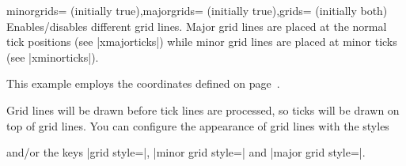 \begin{pgfplotsxykeylist}{\x minorgrids= (initially true),\x majorgrids= (initially true),grids= (initially both)}
Enables/disables different grid lines. Major grid lines are placed at the normal tick positions (see |xmajorticks|) while minor grid lines are placed at minor ticks (see |xminorticks|). 

This example employs the coordinates defined on page~\pageref{page:plotcoords:src}.
\begin{codeexample}[]
\begin{tikzpicture}
\begin{loglogaxis}[
	xlabel={\textsc{Dof}},
	ylabel={$L_2$ Error},
	grid=major
]
\plotcoords
\end{loglogaxis}
\end{tikzpicture}
\end{codeexample}

\begin{codeexample}[]
\end{codeexample}

Grid lines will be drawn before tick lines are processed, so ticks will be drawn on top of grid lines. You can configure the appearance of grid lines with the styles
\begin{codeexample}
\end{codeexample}
\noindent and/or the keys |grid style=|, |minor grid style=| and |major grid style=|.
\end{pgfplotsxykeylist}


